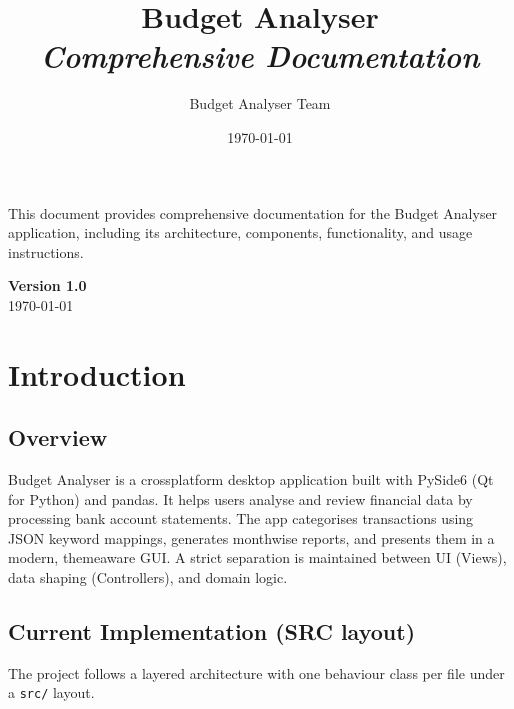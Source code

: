 \documentclass[11pt,a4paper]{report}
\title{
    \vspace{1cm}
    {\Huge\bfseries Budget Analyser}\\
    \vspace{0.5cm}
    {\large\textit{Comprehensive Documentation}}\\
    \vspace{2cm}
}
\author{Budget Analyser Team}
\date{\today}
\begin{document}
\begin{titlepage}
    \maketitle
    \begin{center}
        \vfill
        \begin{tcolorbox}[colback=primary!10,colframe=primary,width=0.8\textwidth]
            \centering
            \large This document provides comprehensive documentation for the Budget Analyser application, including its architecture, components, functionality, and usage instructions.
        \end{tcolorbox}
        \vfill
        \textbf{Version 1.0}\\
        \today
    \end{center}
\end{titlepage}

\tableofcontents

\chapter{Introduction}

\section{Overview}
Budget Analyser is a cross\-platform desktop application built with PySide6 (Qt for Python) and pandas. It helps users analyse and review financial data by processing bank account statements. The app categorises transactions using JSON keyword mappings, generates month\-wise reports, and presents them in a modern, theme\-aware GUI. A strict separation is maintained between UI (Views), data shaping (Controllers), and domain logic.

\section{Current Implementation (SRC layout)}
\label{sec:current-implementation}

The project follows a layered architecture with one behaviour class per file under a \texttt{src/} layout.
\end{document}
